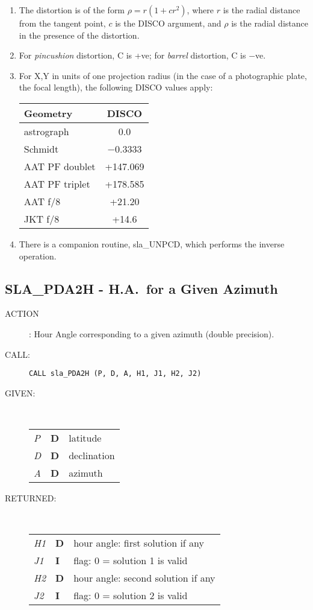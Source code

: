 \documentclass[11pt,twoside]{article}
\newcommand{\xlabel}[1]{}
\newcommand{\routine}[3]
{\hbadness=10000
  \vbox
  {
    \rule{\textwidth}{0.3mm}\\
    {\Large {\bf #1} \hfill #2 \hfill {\bf #1}}\\
    \setlength{\oldspacing}{\topsep}
    \setlength{\topsep}{0.3ex}
    \begin{description}
      #3
    \end{description}
    \setlength{\topsep}{\oldspacing}
  }
}
\renewcommand{\routine}[3]
   {
      \subsection{#1\xlabel{#1} - #2\label{#1}}
       \begin{description}
         #3
       \end{description}
   }
\newcommand{\action}[1]
{\item[ACTION]: #1}
\newcommand{\action}[1]
   {\item[ACTION:] #1}
\newcommand{\call}[1]
{\item[CALL]: \hspace{0.4em}{\tt #1}}
\newlength{\oldspacing}
\renewcommand{\call}[1]
   {
    \item[CALL:] {\tt #1}
   }
\newcommand{\args}[2]
{
  \goodbreak
  \setlength{\oldspacing}{\topsep}
  \setlength{\topsep}{0.3ex}
  \begin{description}
  \item[#1]:\\[1.5ex]
    \begin{tabular}{p{7em}p{6em}p{22em}}
      #2
    \end{tabular}
  \end{description}
  \setlength{\topsep}{\oldspacing}
}
\renewcommand{\args}[2]
   {
     \begin{description}
        \item[#1:]\\
        \begin{tabular}{p{7em}p{6em}l}
           #2
        \end{tabular}
     \end{description}
   }
\newcommand{\spec}[3]
{
  {\em {#1}} & {\bf \mbox{#2}} & {#3}
}
\begin{document}
{
 \begin{enumerate}
  \item The distortion is of the form $\rho = r (1 + c r^{2})$, where $r$ is
        the radial distance from the tangent point, $c$ is the DISCO
        argument, and $\rho$ is the radial distance in the presence of
        the distortion.
  \item For {\it pincushion}\/ distortion, C is +ve;  for
        {\it barrel}\/ distortion, C is $-$ve.
  \item For X,Y in units of one projection radius (in the case of
        a photographic plate, the focal length), the following
        DISCO values apply:

        \vspace{2ex}

        \hspace{5em}
        \begin{tabular}{|l|c|} \hline
         Geometry & DISCO \\ \hline \hline
         astrograph & 0.0 \\ \hline
         Schmidt & $-$0.3333 \\ \hline
         AAT PF doublet & +147.069 \\ \hline
         AAT PF triplet & +178.585 \\ \hline
         AAT f/8 & +21.20 \\ \hline
         JKT f/8 & +14.6 \\ \hline
        \end{tabular}

        \vspace{2ex}

  \item There is a companion routine, sla\_UNPCD, which performs the
        inverse operation.
 \end{enumerate}
}
\routine{SLA\_PDA2H}{H.A.\ for a Given Azimuth}
{
 \action{Hour Angle corresponding to a given azimuth (double precision).}
 \call{CALL sla\_PDA2H (P, D, A, H1, J1, H2, J2)}
}
\args{GIVEN}
{
 \spec{P}{D}{latitude} \\
 \spec{D}{D}{declination} \\
 \spec{A}{D}{azimuth}
}
\args{RETURNED}
{
 \spec{H1}{D}{hour angle:  first solution if any} \\
 \spec{J1}{I}{flag: 0 = solution 1 is valid} \\
 \spec{H2}{D}{hour angle:  second solution if any} \\
 \spec{J2}{I}{flag: 0 = solution 2 is valid}
}
\end{document}
